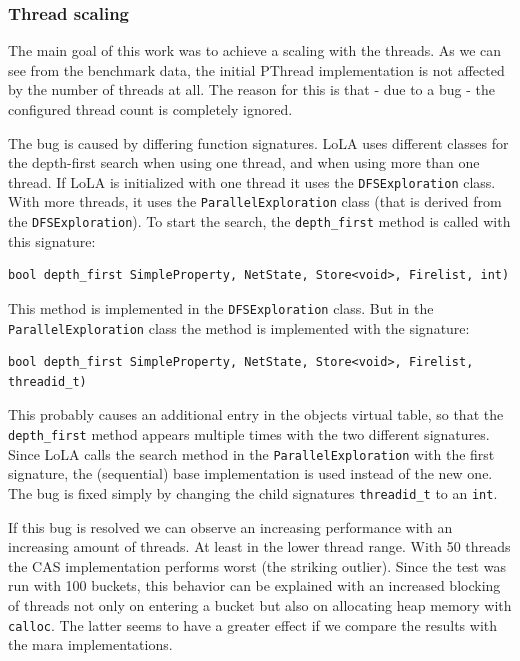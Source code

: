 \subsubsection{Thread scaling}
The main goal of this work was to achieve a scaling with the threads. As we can see from the benchmark data, the initial PThread implementation is not affected by the number of threads at all. The reason for this is that - due to a bug - the configured thread count is completely ignored. 

The bug is caused by differing function signatures. LoLA uses different classes for the depth-first search when using one thread, and when using more than one thread. If LoLA is initialized with one thread it uses the \texttt{DFSExploration} class. With more threads, it uses the \texttt{ParallelExploration} class (that is derived from the \texttt{DFSExploration}). To start the search, the \texttt{depth\_first} method is called with this signature:
\begin{lstlisting}
bool depth_first SimpleProperty, NetState, Store<void>, Firelist, int)
\end{lstlisting}
This method is implemented in the \texttt{DFSExploration} class. But in the \texttt{Parallel\-Exploration} class the method is implemented with the signature: 
\begin{lstlisting}
bool depth_first SimpleProperty, NetState, Store<void>, Firelist, threadid_t)
\end{lstlisting}
 This probably causes an additional entry in the objects virtual table, so that the \texttt{depth\_first} method appears multiple times with the two different signatures. Since LoLA calls the search method in the \texttt{ParallelExploration} with the first signature, the (sequential) base implementation is used instead of the new one. The bug is fixed simply by changing the child signatures \texttt{threadid\_t} to an \texttt{int}.

If this bug is resolved we can observe an increasing performance with an increasing amount of threads. At least in the lower thread range. With 50 threads the CAS implementation performs worst (the striking outlier). Since the test was run with 100 buckets, this behavior can be explained with an increased blocking of threads not only on entering a bucket but also on allocating heap memory with \texttt{calloc}. The latter seems to have a greater effect if we compare the results with the mara implementations.

